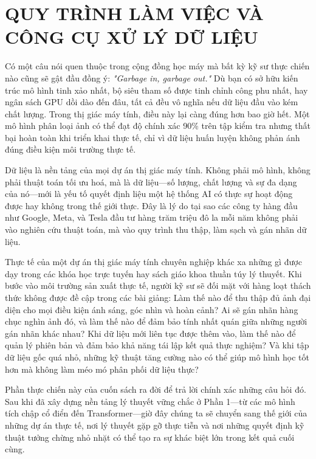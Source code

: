 \chapter{QUY TRÌNH LÀM VIỆC VÀ CÔNG CỤ XỬ LÝ DỮ LIỆU}
\label{chap:p2_data_pipeline}

Có một câu nói quen thuộc trong cộng đồng học máy mà bất kỳ kỹ sư thực chiến nào cũng sẽ gật đầu đồng ý: \textit{"Garbage in, garbage out."} Dù bạn có sở hữu kiến trúc mô hình tinh xảo nhất, bộ siêu tham số được tinh chỉnh công phu nhất, hay ngân sách GPU dồi dào đến đâu, tất cả đều vô nghĩa nếu dữ liệu đầu vào kém chất lượng. Trong thị giác máy tính, điều này lại càng đúng hơn bao giờ hết. Một mô hình phân loại ảnh có thể đạt độ chính xác 90\% trên tập kiểm tra nhưng thất bại hoàn toàn khi triển khai thực tế, chỉ vì dữ liệu huấn luyện không phản ánh đúng điều kiện môi trường thực tế.

Dữ liệu là nền tảng của mọi dự án thị giác máy tính. Không phải mô hình, không phải thuật toán tối ưu hoá, mà là dữ liệu---số lượng, chất lượng và sự đa dạng của nó---mới là yếu tố quyết định liệu một hệ thống AI có thực sự hoạt động được hay không trong thế giới thực. Đây là lý do tại sao các công ty hàng đầu như Google, Meta, và Tesla đầu tư hàng trăm triệu đô la mỗi năm không phải vào nghiên cứu thuật toán, mà vào quy trình thu thập, làm sạch và gán nhãn dữ liệu.

Thực tế của một dự án thị giác máy tính chuyên nghiệp khác xa những gì được dạy trong các khóa học trực tuyến hay sách giáo khoa thuần túy lý thuyết. Khi bước vào môi trường sản xuất thực tế, người kỹ sư sẽ đối mặt với hàng loạt thách thức không được đề cập trong các bài giảng: Làm thế nào để thu thập đủ ảnh đại diện cho mọi điều kiện ánh sáng, góc nhìn và hoàn cảnh? Ai sẽ gán nhãn hàng chục nghìn ảnh đó, và làm thế nào để đảm bảo tính nhất quán giữa những người gán nhãn khác nhau? Khi dữ liệu mới liên tục được thêm vào, làm thế nào để quản lý phiên bản và đảm bảo khả năng tái lập kết quả thực nghiệm? Và khi tập dữ liệu gốc quá nhỏ, những kỹ thuật tăng cường nào có thể giúp mô hình học tốt hơn mà không làm méo mó phân phối dữ liệu thực?

Phần thực chiến này của cuốn sách ra đời để trả lời chính xác những câu hỏi đó. Sau khi đã xây dựng nền tảng lý thuyết vững chắc ở Phần 1---từ các mô hình tích chập cổ điển đến Transformer---giờ đây chúng ta sẽ chuyển sang thế giới của những dự án thực tế, nơi lý thuyết gặp gỡ thực tiễn và nơi những quyết định kỹ thuật tưởng chừng nhỏ nhặt có thể tạo ra sự khác biệt lớn trong kết quả cuối cùng.


